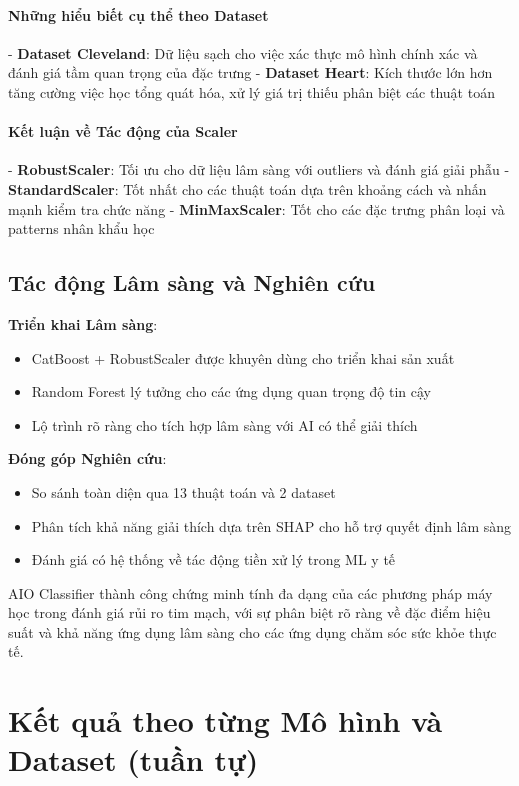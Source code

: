 \paragraph{Những hiểu biết cụ thể theo Dataset}
- \textbf{Dataset Cleveland}: Dữ liệu sạch cho việc xác thực mô hình chính xác và đánh giá tầm quan trọng của đặc trưng
- \textbf{Dataset Heart}: Kích thước lớn hơn tăng cường việc học tổng quát hóa, xử lý giá trị thiếu phân biệt các thuật toán

\paragraph{Kết luận về Tác động của Scaler}
- \textbf{RobustScaler}: Tối ưu cho dữ liệu lâm sàng với outliers và đánh giá giải phẫu
- \textbf{StandardScaler}: Tốt nhất cho các thuật toán dựa trên khoảng cách và nhấn mạnh kiểm tra chức năng  
- \textbf{MinMaxScaler}: Tốt cho các đặc trưng phân loại và patterns nhân khẩu học

\subsection{Tác động Lâm sàng và Nghiên cứu}

\textbf{Triển khai Lâm sàng}:
\begin{itemize}
    \item CatBoost + RobustScaler được khuyên dùng cho triển khai sản xuất
    \item Random Forest lý tưởng cho các ứng dụng quan trọng độ tin cậy
    \item Lộ trình rõ ràng cho tích hợp lâm sàng với AI có thể giải thích
\end{itemize}

\textbf{Đóng góp Nghiên cứu}:
\begin{itemize}
    \item So sánh toàn diện qua 13 thuật toán và 2 dataset
    \item Phân tích khả năng giải thích dựa trên SHAP cho hỗ trợ quyết định lâm sàng
    \item Đánh giá có hệ thống về tác động tiền xử lý trong ML y tế
\end{itemize}

AIO Classifier thành công chứng minh tính đa dạng của các phương pháp máy học trong đánh giá rủi ro tim mạch, với sự phân biệt rõ ràng về đặc điểm hiệu suất và khả năng ứng dụng lâm sàng cho các ứng dụng chăm sóc sức khỏe thực tế.
\section{Kết quả theo từng Mô hình và Dataset (tuần tự)}\label{sec:per-model-results}

